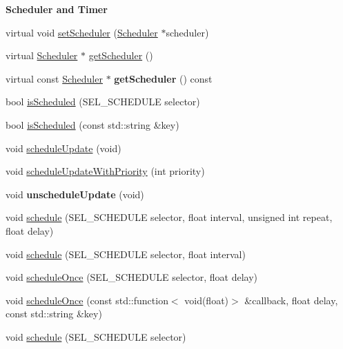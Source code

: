 \begin{Indent}\textbf{ Scheduler and Timer}\par
\begin{DoxyCompactItemize}
\item 
virtual void \hyperlink{classNode_a9f0c84dfabdce76b5251725944ae7706}{set\+Scheduler} (\hyperlink{classScheduler}{Scheduler} $\ast$scheduler)
\item 
virtual \hyperlink{classScheduler}{Scheduler} $\ast$ \hyperlink{classNode_a5d438ab0f04dfa3af9a72ae608478264}{get\+Scheduler} ()
\item 
\mbox{\label{classNode_a57abd1306ae11bd89f2c38bf7e6a4082}} 
virtual const \hyperlink{classScheduler}{Scheduler} $\ast$ {\bfseries get\+Scheduler} () const
\item 
bool \hyperlink{classNode_ab9a193072ebab587d1932d8af52050e0}{is\+Scheduled} (S\+E\+L\+\_\+\+S\+C\+H\+E\+D\+U\+LE selector)
\item 
bool \hyperlink{classNode_a335b7157808d2c0a38b4de04382749f5}{is\+Scheduled} (const std\+::string \&key)
\item 
void \hyperlink{classNode_a8ff9ae5e15fe4d737da30f2b05f84c1c}{schedule\+Update} (void)
\item 
void \hyperlink{classNode_aa86137d5229cb83acf5cee129a83b818}{schedule\+Update\+With\+Priority} (int priority)
\item 
\mbox{\label{classNode_a4f4252bff36a5ce566ff66f80f9d38ee}} 
void {\bfseries unschedule\+Update} (void)
\item 
void \hyperlink{classNode_a5957efe46bfe7f83f9adb5b737f7ce11}{schedule} (S\+E\+L\+\_\+\+S\+C\+H\+E\+D\+U\+LE selector, float interval, unsigned int repeat, float delay)
\item 
void \hyperlink{classNode_a7cf87e23665a003982321d5e4fc98c11}{schedule} (S\+E\+L\+\_\+\+S\+C\+H\+E\+D\+U\+LE selector, float interval)
\item 
void \hyperlink{classNode_a85353a5e8ae9f374001fa9f89ccc9adb}{schedule\+Once} (S\+E\+L\+\_\+\+S\+C\+H\+E\+D\+U\+LE selector, float delay)
\item 
void \hyperlink{classNode_a733ed19d0f4bbffcab1536b43ce8407d}{schedule\+Once} (const std\+::function$<$ void(float)$>$ \&callback, float delay, const std\+::string \&key)
\item 
void \hyperlink{classNode_a9f0944b744eb47a227780375597ba997}{schedule} (S\+E\+L\+\_\+\+S\+C\+H\+E\+D\+U\+LE selector)
\item 

\end{DoxyCompactItemize}
\end{Indent}
